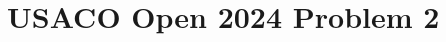 \documentclass[a4paper, 12pt]{article}
\begin{document}
\section*{USACO Open 2024 Problem 2}

\begin{chirpbox}
\begin{problem}
    
\end{problem}
\end{chirpbox}

\begin{observation}
\end{observation}

\begin{solution}
\end{solution}
\end{document}
